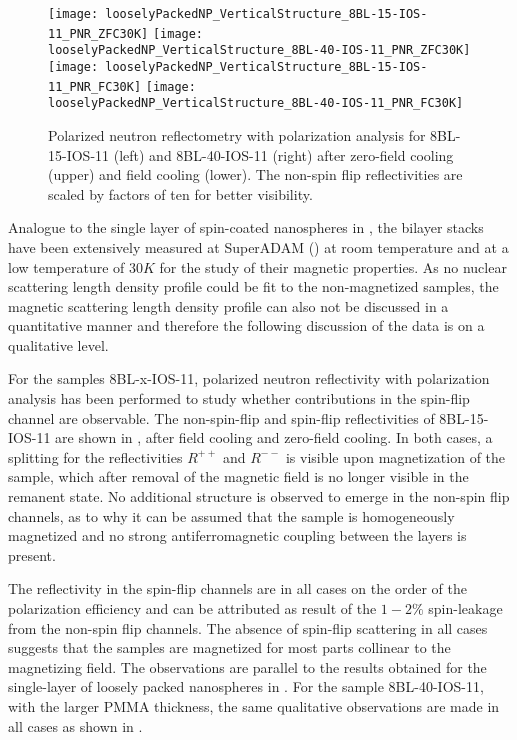 \documentclass[\main/dresen_thesis.tex]{subfiles}
\begin{document}
  \label{sec:looselyPackedNS:bilayerStacks:pnr}

  \begin{figure}[tb]
    \centering
    \texttt{[image: looselyPackedNP\_VerticalStructure\_8BL-15-IOS-11\_PNR\_ZFC30K]}
    \texttt{[image: looselyPackedNP\_VerticalStructure\_8BL-40-IOS-11\_PNR\_ZFC30K]}
    \texttt{[image: looselyPackedNP\_VerticalStructure\_8BL-15-IOS-11\_PNR\_FC30K]}
    \texttt{[image: looselyPackedNP\_VerticalStructure\_8BL-40-IOS-11\_PNR\_FC30K]}
    \caption{\label{fig:looselyPackedNP:bilayer:pnr:8BL-x-IOS11}Polarized neutron reflectometry with polarization analysis for 8BL-15-IOS-11 (left) and 8BL-40-IOS-11 (right) after zero-field cooling (upper) and field cooling (lower). The non-spin flip reflectivities are scaled by factors of ten for better visibility. }
  \end{figure}

  Analogue to the single layer of spin-coated nanospheres in , the bilayer stacks have been extensively measured at SuperADAM () at room temperature and at a low temperature of $30 \unit{K}$ for the study of their magnetic properties.
  As no nuclear scattering length density profile could be fit to the non-magnetized samples, the magnetic scattering length density profile can also not be discussed in a quantitative manner and therefore the following discussion of the data is on a qualitative level.

  For the samples 8BL-x-IOS-11, polarized neutron reflectivity with polarization analysis has been performed to study whether contributions in the spin-flip channel are observable.
  The non-spin-flip and spin-flip reflectivities of 8BL-15-IOS-11 are shown in , after field cooling and zero-field cooling.
  In both cases, a splitting for the reflectivities $R^{++}$ and $R^{--}$ is visible upon magnetization of the sample, which after removal of the magnetic field is no longer visible in the remanent state.
  No additional structure is observed to emerge in the non-spin flip channels, as to why it can be assumed that the sample is homogeneously magnetized and no strong antiferromagnetic coupling between the layers is present.

  The reflectivity in the spin-flip channels are in all cases on the order of the polarization efficiency and can be attributed as result of the $1 - 2 \%$ spin-leakage from the non-spin flip channels.
  The absence of spin-flip scattering in all cases suggests that the samples are magnetized for most parts collinear to the magnetizing field.
  The observations are parallel to the results obtained for the single-layer of loosely packed nanospheres in .
  For the sample 8BL-40-IOS-11, with the larger PMMA thickness, the same qualitative observations are made in all cases as shown in .
\end{document}

